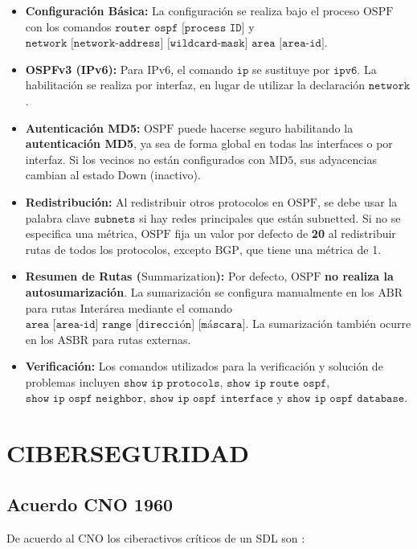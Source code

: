 \documentclass[a5paper]{book}%
\begin{document}
  \begin{itemize}
  	\item \textbf{Configuración Básica:} La configuración se realiza bajo el proceso $\text{OSPF}$ con los comandos $\texttt{router ospf [process ID]}$ y $\texttt{network [network-address] [wildcard-mask] area [area-id]}$.
  	\item \textbf{OSPFv3 (IPv6):} Para $\text{IPv6}$, el comando $\texttt{ip}$ se sustituye por $\texttt{ipv6}$. La habilitación se realiza por interfaz, en lugar de utilizar la declaración $\texttt{network}$.
  	\item \textbf{Autenticación MD5:} $\text{OSPF}$ puede hacerse seguro habilitando la \textbf{autenticación MD5}, ya sea de forma global en todas las interfaces o por interfaz. Si los vecinos no están configurados con $\text{MD5}$, sus adyacencias cambian al estado $\text{Down}$ (inactivo).
  	\item \textbf{Redistribución:} Al redistribuir otros protocolos en $\text{OSPF}$, se debe usar la palabra clave $\texttt{subnets}$ si hay redes principales que están $\text{subnetted}$. Si no se especifica una métrica, $\text{OSPF}$ fija un valor por defecto de \textbf{20} al redistribuir rutas de todos los protocolos, excepto $\text{BGP}$, que tiene una métrica de 1.
  	\item \textbf{Resumen de Rutas ($\text{Summarization}$):} Por defecto, $\text{OSPF}$ \textbf{no realiza la autosumarización}. La sumarización se configura manualmente en los $\text{ABR}$ para rutas Interárea mediante el comando $\texttt{area [area-id] range [dirección] [máscara]}$. La sumarización también ocurre en los $\text{ASBR}$ para rutas externas.
  	\item \textbf{Verificación:} Los comandos utilizados para la verificación y solución de problemas incluyen $\texttt{show ip protocols}$, $\texttt{show ip route ospf}$, $\texttt{show ip ospf neighbor}$, $\texttt{show ip ospf interface}$ y $\texttt{show ip ospf database}$.
  \end{itemize}
  

  \chapter{CIBERSEGURIDAD}

  \section{Acuerdo CNO 1960}

  De acuerdo al \ac{CNO} los ciberactivos críticos de un \ac{SDL} son :
\end{document}
